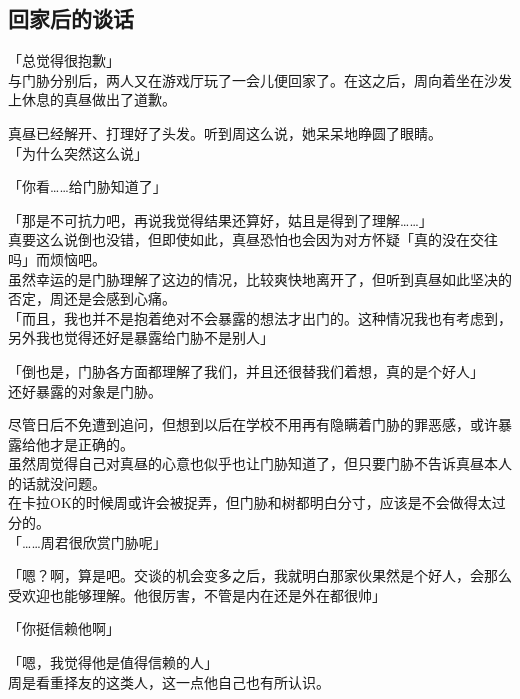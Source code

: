 \subsection{回家后的谈话}

「总觉得很抱歉」\\

与门胁分别后，两人又在游戏厅玩了一会儿便回家了。在这之后，周向着坐在沙发上休息的真昼做出了道歉。

真昼已经解开、打理好了头发。听到周这么说，她呆呆地睁圆了眼睛。\\

「为什么突然这么说」

「你看……给门胁知道了」

「那是不可抗力吧，再说我觉得结果还算好，姑且是得到了理解……」\\

真要这么说倒也没错，但即使如此，真昼恐怕也会因为对方怀疑「真的没在交往吗」而烦恼吧。\\

虽然幸运的是门胁理解了这边的情况，比较爽快地离开了，但听到真昼如此坚决的否定，周还是会感到心痛。\\

「而且，我也并不是抱着绝对不会暴露的想法才出门的。这种情况我也有考虑到，另外我也觉得还好是暴露给门胁不是别人」

「倒也是，门胁各方面都理解了我们，并且还很替我们着想，真的是个好人」\\

还好暴露的对象是门胁。

尽管日后不免遭到追问，但想到以后在学校不用再有隐瞒着门胁的罪恶感，或许暴露给他才是正确的。\\

虽然周觉得自己对真昼的心意也似乎也让门胁知道了，但只要门胁不告诉真昼本人的话就没问题。\\

在卡拉OK的时候周或许会被捉弄，但门胁和树都明白分寸，应该是不会做得太过分的。\\

「……周君很欣赏门胁呢」

「嗯？啊，算是吧。交谈的机会变多之后，我就明白那家伙果然是个好人，会那么受欢迎也能够理解。他很厉害，不管是内在还是外在都很帅」

「你挺信赖他啊」

「嗯，我觉得他是值得信赖的人」\\

周是看重择友的这类人，这一点他自己也有所认识。\\

